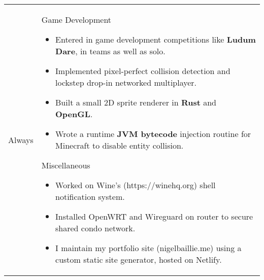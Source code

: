 \documentclass[11pt]{article}
\newenvironment{timeline}
        {\begin{tabular}{p{21 mm}|p{150 mm}}}
        {\end{tabular}}
\newenvironment{timelinetitle}
        {\vspace{-2 mm}\begin{large}}
        {\end{large}\vspace{-1.5 mm}}
\newcommand{\timespan}[2]{{#2}\newline{#1}}
\begin{document}
\begin{timeline}
\timespan{2011}{Always}
&
\begin{timelinetitle}
    Game Development
\end{timelinetitle}
\begin{itemize}
  \item[] Entered in game development competitions like \textbf{Ludum Dare}, in teams as well as solo.

  \item[] Implemented pixel-perfect collision detection and lockstep drop-in networked multiplayer.

  \item[] Built a small 2D sprite renderer in \textbf{Rust} and \textbf{OpenGL}.

  \item[] Wrote a runtime \textbf{JVM bytecode} injection routine for Minecraft to disable entity collision.
\end{itemize}

\vspace{0.5cm}

\begin{timelinetitle}
    Miscellaneous
\end{timelinetitle}
\begin{itemize}
  \item[] Worked on Wine's (https://winehq.org) shell notification system.

  \item[] Installed OpenWRT and Wireguard on router to secure shared condo network.

  \item[] I maintain my portfolio site (nigelbaillie.me) using a custom static site generator, hosted on Netlify.
\end{itemize}

\end{timeline}
\end{document}
